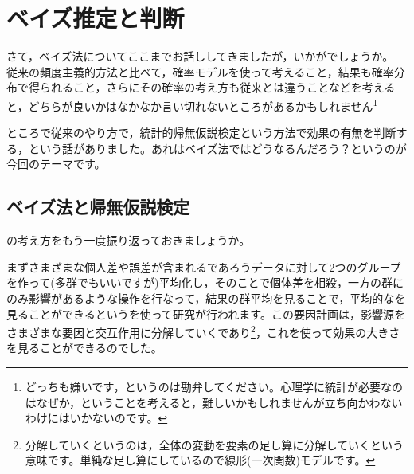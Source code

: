 \documentclass{ltjbook}
\begin{document}
\VerbatimFootnotes
\chapter{ベイズ推定と判断}
\label{m27_bayesian3}
さて，ベイズ法についてここまでお話ししてきましたが，いかがでしょうか。
従来の頻度主義的方法と比べて，確率モデルを使って考えること，結果も確率分布で得られること，さらにその確率の考え方も従来とは違うことなどを考えると，どちらが良いかはなかなか言い切れないところがあるかもしれません\footnote{どっちも嫌いです，というのは勘弁してください。心理学に統計が必要なのはなぜか，ということを考えると，難しいかもしれませんが立ち向かわないわけにはいかないのです。}

ところで従来のやり方で，統計的帰無仮説検定という方法で効果の有無を判断する，という話がありました。あれはベイズ法ではどうなるんだろう？というのが今回のテーマです。

\section{ベイズ法と帰無仮説検定}
の考え方をもう一度振り返っておきましょうか。

まずさまざまな個人差や誤差が含まれるであろうデータに対して2つのグループを作って(多群でもいいですが)平均化し，そのことで個体差を相殺，一方の群にのみ影響があるような操作を行なって，結果の群平均を見ることで，平均的なを見ることができるというを使って研究が行われます。この要因計画は，影響源をさまざまな要因と交互作用に分解していくであり\footnote{分解していくというのは，全体の変動を要素の足し算に分解していくという意味です。単純な足し算にしているので線形(一次関数)モデルです。}，これを使って効果の大きさを見ることができるのでした。
\end{document}
